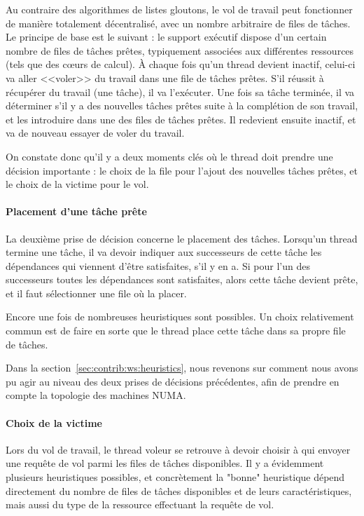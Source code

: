 Au contraire des algorithmes de listes gloutons, le vol de travail peut fonctionner de manière totalement décentralisé, avec un nombre arbitraire de files de tâches.
Le principe de base est le suivant : le support exécutif dispose d'un certain nombre de files de tâches prêtes, typiquement associées aux différentes ressources (tels que des cœurs de calcul).
À chaque fois qu'un thread devient inactif, celui-ci va aller <<voler>> du travail dans une file de tâches prêtes.
S'il réussit à récupérer du travail (une tâche), il va l'exécuter.
Une fois sa tâche terminée, il va déterminer s'il y a des nouvelles tâches prêtes suite à la complétion de son travail, et les introduire dans une des files de tâches prêtes.
Il redevient ensuite inactif, et va de nouveau essayer de voler du travail.

On constate donc qu'il y a deux moments clés où le thread doit prendre une décision importante : le choix de la file pour l'ajout des nouvelles tâches prêtes, et le choix de la victime pour le vol.

\paragraph{Placement d'une tâche prête}

La deuxième prise de décision concerne le placement des tâches.
Lorsqu'un thread termine une tâche, il va devoir indiquer aux successeurs de cette tâche les dépendances qui viennent d'être satisfaites, s'il y en a.
Si pour l'un des successeurs toutes les dépendances sont satisfaites, alors cette tâche devient prête, et il faut sélectionner une file où la placer.

Encore une fois de nombreuses heuristiques sont possibles. Un choix relativement commun est de faire en sorte que le thread place cette tâche dans sa propre file de tâches.


Dans la section~\ref{sec:contrib:ws:heuristics}, nous revenons sur comment nous avons pu agir au niveau des deux prises de décisions précédentes, afin de prendre en compte la topologie des machines NUMA.

\paragraph{Choix de la victime}

Lors du vol de travail, le thread voleur se retrouve à devoir choisir à qui envoyer une requête de vol parmi les files de tâches disponibles.
Il y a évidemment plusieurs heuristiques possibles, et concrètement la "bonne" heuristique dépend directement du nombre de files de tâches disponibles et de leurs caractéristiques, mais aussi du type de la ressource effectuant la requête de vol.

